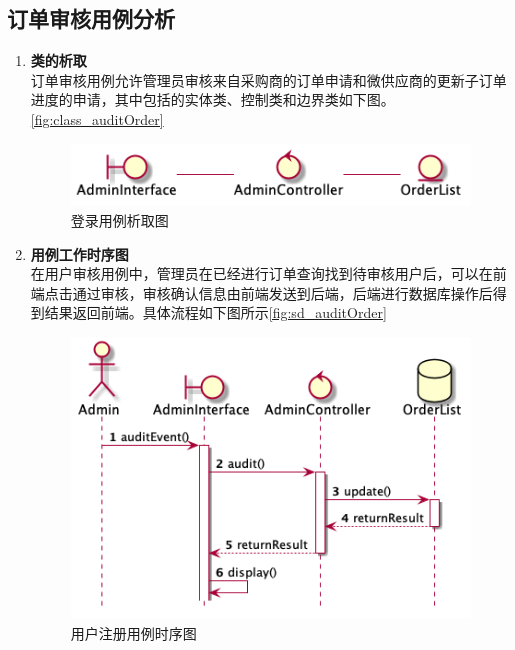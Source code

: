 	\subsection{订单审核用例分析} %
	\label{sub:订单审核用例分析}
	\begin{enumerate}
		\item \textbf{类的析取} \\
		订单审核用例允许管理员审核来自采购商的订单申请和微供应商的更新子订单进度的申请，其中包括的实体类、控制类和边界类如下图。
		\autoref{fig:class_auditOrder}
		\begin{figure}[htp]
		    \centering
		    \includegraphics[width=12cm]{misc/figure_src/class_diagram/auditOrder.png}
		    \caption{登录用例析取图}
		    \label{fig:class_auditOrder}
		\end{figure}

		\item \textbf{用例工作时序图} \\
		在用户审核用例中，管理员在已经进行订单查询找到待审核用户后，可以在前端点击通过审核，审核确认信息由前端发送到后端，后端进行数据库操作后得到结果返回前端。具体流程如下图所示\autoref{fig:sd_auditOrder}

		\begin{figure}[htp]
		    \centering
		    \includegraphics[width=12cm]{misc/figure_src/sequence_diagram/sd_audit_order.png}
		    \caption{用户注册用例时序图}
		    \label{fig:sd_auditOrder}
		\end{figure}
	\end{enumerate}

